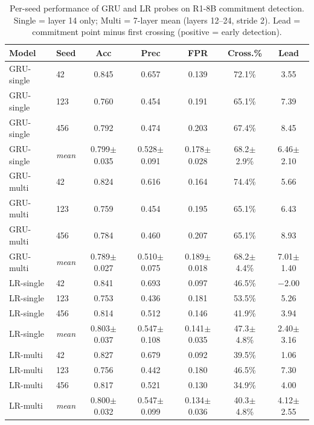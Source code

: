 
\begin{table}[h]
\centering
\caption{Per-seed performance of GRU and LR probes on R1-8B commitment detection.
Single = layer 14 only; Multi = 7-layer mean (layers 12--24, stride 2).
Lead = commitment point minus first crossing (positive = early detection).}
\label{tab:gru_per_seed}
\small
\begin{tabular}{llccccc}
\toprule
Model & Seed & Acc & Prec & FPR & Cross.\% & Lead \\
\midrule
GRU-single & 42  & 0.845 & 0.657 & 0.139 & 72.1\% & 3.55 \\
GRU-single & 123 & 0.760 & 0.454 & 0.191 & 65.1\% & 7.39 \\
GRU-single & 456 & 0.792 & 0.474 & 0.203 & 67.4\% & 8.45 \\
\rowcolor{gray!10}
GRU-single & \textit{mean} & 0.799$\pm$0.035 & 0.528$\pm$0.091 & 0.178$\pm$0.028 & 68.2$\pm$2.9\% & 6.46$\pm$2.10 \\
\midrule
GRU-multi  & 42  & 0.824 & 0.616 & 0.164 & 74.4\% & 5.66 \\
GRU-multi  & 123 & 0.759 & 0.454 & 0.195 & 65.1\% & 6.43 \\
GRU-multi  & 456 & 0.784 & 0.460 & 0.207 & 65.1\% & 8.93 \\
\rowcolor{gray!10}
GRU-multi  & \textit{mean} & 0.789$\pm$0.027 & 0.510$\pm$0.075 & 0.189$\pm$0.018 & 68.2$\pm$4.4\% & 7.01$\pm$1.40 \\
\midrule
LR-single  & 42  & 0.841 & 0.693 & 0.097 & 46.5\% & $-$2.00 \\
LR-single  & 123 & 0.753 & 0.436 & 0.181 & 53.5\% & 5.26 \\
LR-single  & 456 & 0.814 & 0.512 & 0.146 & 41.9\% & 3.94 \\
\rowcolor{gray!10}
LR-single  & \textit{mean} & 0.803$\pm$0.037 & 0.547$\pm$0.108 & 0.141$\pm$0.035 & 47.3$\pm$4.8\% & 2.40$\pm$3.16 \\
\midrule
LR-multi   & 42  & 0.827 & 0.679 & 0.092 & 39.5\% & 1.06 \\
LR-multi   & 123 & 0.756 & 0.442 & 0.180 & 46.5\% & 7.30 \\
LR-multi   & 456 & 0.817 & 0.521 & 0.130 & 34.9\% & 4.00 \\
\rowcolor{gray!10}
LR-multi   & \textit{mean} & 0.800$\pm$0.032 & 0.547$\pm$0.099 & 0.134$\pm$0.036 & 40.3$\pm$4.8\% & 4.12$\pm$2.55 \\
\bottomrule
\end{tabular}
\end{table}
